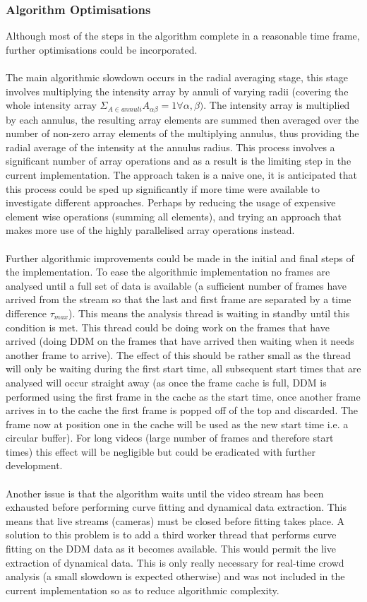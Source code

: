 \documentclass[10pt]{article}
\begin{document}
\subsubsection{Algorithm Optimisations}
Although most of the steps in the algorithm complete in a reasonable time frame, further optimisations could be incorporated.
\\\\
The main algorithmic slowdown occurs in the radial averaging stage, this stage involves multiplying the intensity array by annuli of varying radii (covering the whole intensity array $\Sigma_{A \in annuli} A_{\alpha \beta} = 1 \forall \alpha, \beta)$. The intensity array is multiplied by each annulus, the resulting array elements are summed then averaged over the number of non-zero array elements of the multiplying annulus, thus providing the radial average of the intensity at the annulus radius. This process involves a significant number of array operations and as a result is the limiting step in the current implementation. The approach taken is a naive one, it is anticipated that this process could be sped up significantly if more time were available to investigate different approaches. Perhaps by reducing the usage of expensive element wise operations (summing all elements), and trying an approach that makes more use of the highly parallelised array operations instead.
\\\\
Further algorithmic improvements could be made in the initial and final steps of the implementation. To ease the algorithmic implementation no frames are analysed until a full set of data is available (a sufficient number of frames have arrived from the stream so that the last and first frame are separated by a time difference $\tau_{max}$). This means the analysis thread is waiting in standby until this condition is met. This thread could be doing work on the frames that have arrived (doing DDM on the frames that have arrived then waiting when it needs another frame to arrive). The effect of this should be rather small as the thread will only be waiting during the first start time, all subsequent start times that are analysed will occur straight away (as once the frame cache is full, DDM is performed using the first frame in the cache as the start time, once another frame arrives in to the cache the first frame is popped off of the top and discarded. The frame now at position one in the cache will be used as the new start time i.e. a circular buffer). For long videos (large number of frames and therefore start times) this effect will be negligible but could be eradicated with further development. 
\\\\
Another issue is that the algorithm waits until the video stream has been exhausted before performing curve fitting and dynamical data extraction. This means that live streams (cameras) must be closed before fitting takes place. A solution to this problem is to add a third worker thread that performs curve fitting on the DDM data as it becomes available. This would permit the live extraction of dynamical data. This is only really necessary for real-time crowd analysis (a small slowdown is expected otherwise) and was not included in the current implementation so as to reduce algorithmic complexity.
\end{document}
